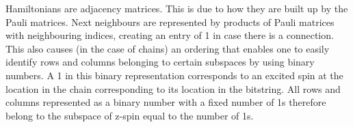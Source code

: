 \begin{center}
\end{center}

\noindent Hamiltonians are adjacency matrices. This is due to how they are built up by the Pauli matrices. Next neighbours are represented by products of Pauli matrices with neighbouring indices, creating an entry of 1 in case there is a connection. This also causes (in the case of chains) an ordering that enables one to easily identify rows and columns belonging to certain subspaces by using binary numbers. A 1 in this binary representation corresponds to an excited spin at the location in the chain corresponding to its location in the bitstring. All rows and columns represented as a binary number with a fixed number of 1s therefore belong to the subspace of z-spin equal to the number of 1s.


